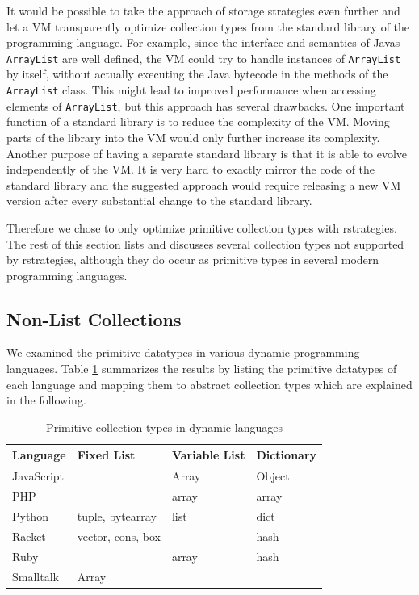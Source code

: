 \documentclass[english,10pt]{sigplanconf}
\begin{document}
It would be possible to take the approach of storage strategies even
further and let a VM transparently optimize collection types from
the standard library of the programming language.  For example, since
the interface and semantics of Javas \lstinline{ArrayList} are well
defined, the VM could try to handle instances of \lstinline{ArrayList}
by itself, without actually executing the Java bytecode in the methods
of the \lstinline{ArrayList} class.  This might lead to improved
performance when accessing elements of \lstinline{ArrayList}, but this
approach has several drawbacks.  One important function of a standard
library is to reduce the complexity of the VM.  Moving parts of the
library into the VM would only further increase its complexity.
Another purpose of having a separate standard library is that it is
able to evolve independently of the VM.  It is very hard to exactly
mirror the code of the standard library and the suggested approach
would require releasing a new VM version after every substantial
change to the standard library.

Therefore we chose to only optimize primitive collection types with
rstrategies.  The rest of this section lists and discusses several
collection types not supported by rstrategies, although they do occur
as primitive types in several modern programming languages.

\subsection{Non-List Collections}

We examined the primitive datatypes in various dynamic programming languages.
Table \ref{tab:collectionTypes} summarizes the results by listing the primitive
datatypes of each language and mapping them to abstract collection types which
are explained in the following.

\begin{table}
\centering
\caption{Primitive collection types in dynamic languages}
\label{tab:collectionTypes}
\smaller
\begin{tabular}{ l l l l }
\toprule
Language & Fixed List & Variable List & Dictionary \\
\midrule
JavaScript & & Array & Object \\
PHP & {} & array & array \\
Python & tuple, bytearray & list & dict \\
Racket & vector, cons, box & & hash \\
Ruby & {} & array & hash \\
Smalltalk & Array & & \\
\bottomrule
\end{tabular}
\end{table}
\end{document}
